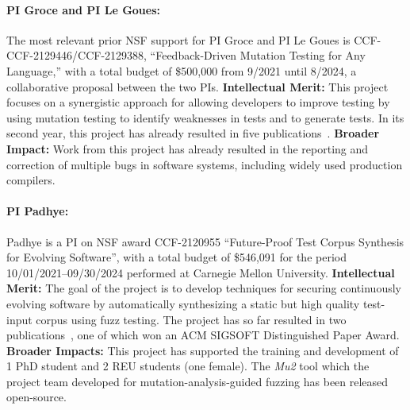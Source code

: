 \paragraph{PI Groce and PI Le Goues:}
The most relevant prior NSF support for PI Groce and PI Le Goues is CCF-
CCF-2129446/CCF-2129388, ``Feedback-Driven Mutation Testing for Any Language,'' with a 
total budget of \$500,000 from 9/2021 until 8/2024,
a collaborative proposal between the two PIs. {\bf Intellectual Merit:} This project
focuses on a synergistic approach for allowing developers
to improve testing by using mutation testing to identify
weaknesses in tests and to generate tests.  In its second
year,  this project has already resulted in five
publications~. {\bf
  Broader
  Impact:}  Work from this project has already
resulted in the reporting and correction of multiple bugs in software
systems, including widely used production compilers.


\paragraph{PI Padhye:}

Padhye is a PI on NSF award CCF-2120955 ``Future-Proof Test Corpus Synthesis for Evolving Software'',
with a total budget of 	\$546,091 for the period 10/01/2021--09/30/2024 performed 
at Carnegie Mellon University. 
{\bf Intellectual Merit:} The goal of the project is to develop techniques for securing continuously evolving software 
by automatically synthesizing a static but high quality test-input corpus using 
fuzz testing. The project has so far resulted in two publications~\cite{naturalfuzz, mu2}, one
of which won an ACM SIGSOFT Distinguished Paper Award. {\bf Broader Impacts:} 
This project has supported the training and development of 1 PhD student and 
2 REU students (one female). The \emph{Mu2} tool which the project team developed
for mutation-analysis-guided fuzzing has been released open-source. 

